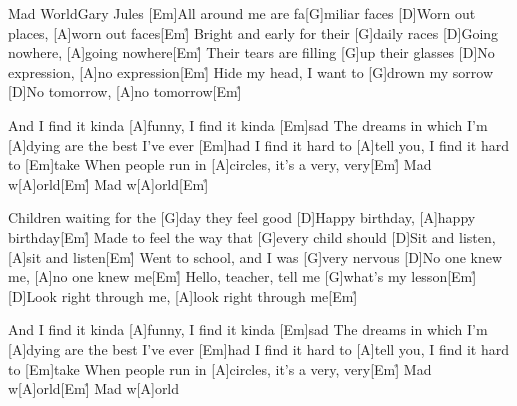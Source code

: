 \documentclass[../main.tex]{subfiles}
\begin{document}
\begin{song}[1]{Mad World}{Gary Jules}{}
[Em]All around me are fa[G]miliar faces
[D]Worn out places, [A]worn out faces[Em]{\h}
Bright and early for their [G]daily races
[D]Going nowhere, [A]going nowhere[Em]{\h}
Their tears are filling [G]up their glasses
[D]No expression, [A]no expression[Em]{\h}
Hide my head, I want to [G]drown my sorrow
[D]No tomorrow, [A]no tomorrow[Em]{\h}

And I find it kinda [A]funny, I find it kinda [Em]sad
The dreams in which I'm [A]dying are the best I've ever [Em]had
I find it hard to [A]tell you, I find it hard to [Em]take
When people run in [A]circles, it's a very, very[Em]{\h}
Mad w[A]orld[Em]{\h}
Mad w[A]orld[Em]{\h}

Children waiting for the [G]day they feel good
[D]Happy birthday, [A]happy birthday[Em]{\h}
Made to feel the way that [G]every child should
[D]Sit and listen, [A]sit and listen[Em]{\h}
Went to school, and I was [G]very nervous
[D]No one knew me, [A]no one knew me[Em]{\h}
Hello, teacher, tell me [G]what's my lesson[Em]{\h}
[D]Look right through me, [A]look right through me[Em]{\h}

And I find it kinda [A]funny, I find it kinda [Em]sad
The dreams in which I'm [A]dying are the best I've ever [Em]had
I find it hard to [A]tell you, I find it hard to [Em]take
When people run in [A]circles, it's a very, very[Em]{\h}
Mad w[A]orld[Em]{\h}
Mad w[A]orld
\end{song}
\end{document}

